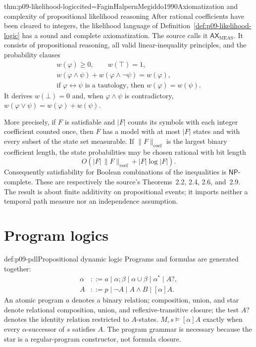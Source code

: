 \begin{hbtheorem}{thm:p09-likelihood-logic}{cited=FaginHalpernMegiddo1990}{Axiomatization and complexity of propositional likelihood reasoning}
After rational coefficients have been cleared to integers, the likelihood
language of Definition~\ref{def:p09-likelihood-logic} has a sound and complete
axiomatization.  The source calls it
\(\mathsf{AX}_{\mathrm{MEAS}}\).  It consists of propositional reasoning, all
valid linear-inequality principles, and the probability clauses
\[
\begin{gathered}
 w(\varphi)\geq0,\qquad w(\top)=1,\\
 w(\varphi\land\psi)+w(\varphi\land\neg\psi)=w(\varphi),\\
 \text{if }\varphi\leftrightarrow\psi\text{ is a tautology, then }
 w(\varphi)=w(\psi).
\end{gathered}
\]
It derives \(w(\bot)=0\) and, when \(\varphi\land\psi\) is contradictory,
\(w(\varphi\lor\psi)=w(\varphi)+w(\psi)\).

More precisely, if \(F\) is satisfiable and \(|F|\) counts its symbols with
each integer coefficient counted once, then \(F\) has a model with at most
\(|F|\) states and with every subset of the state set measurable.  If
\(\lVert F\rVert_{\mathrm{coef}}\) is the largest binary coefficient length,
the state probabilities may be chosen rational with bit length
\[
 O\!\left(|F|\,\lVert F\rVert_{\mathrm{coef}}
          +|F|\log |F|\right).
\]
Consequently satisfiability for Boolean combinations of the inequalities is
\(\mathsf{NP}\)-complete.  These are respectively the source's
Theorems~2.2, 2.4, 2.6, and~2.9.  The result is about finite additivity on
propositional events; it imports neither a temporal path measure nor an
independence assumption.
\end{hbtheorem}







\section{Program logics}
\label{sec:p09-program-logics}

\begin{hbdefinition}{def:p09-pdl}{Propositional dynamic logic}
Programs and formulas are generated together:
\[
\begin{aligned}
 \alpha&::=a\mid\alpha;\beta\mid\alpha\cup\beta\mid\alpha^{*}\mid A?,\\
 A&::=p\mid\neg A\mid A\land B\mid[\alpha]A.
\end{aligned}
\]
An atomic program \(a\) denotes a binary relation; composition, union, and
star denote relational composition, union, and reflexive-transitive closure;
the test \(A?\) denotes the identity relation restricted to \(A\)-states.
\(M,s\models[\alpha]A\) exactly when every \(\alpha\)-successor of \(s\)
satisfies \(A\).  The program grammar is necessary because the star is a
regular-program constructor, not formula closure.
\end{hbdefinition}

